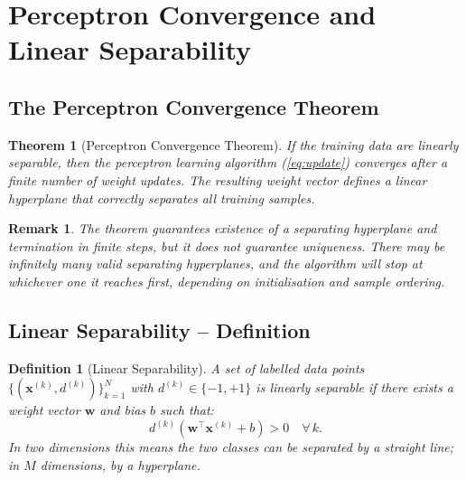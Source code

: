 \documentclass[12pt,a4paper]{article}
\newtheorem{theorem}{Theorem}[section]
\newtheorem{definition}{Definition}[section]
\newtheorem{remark}{Remark}[section]
\begin{document}
\section{Perceptron Convergence and Linear Separability}
\label{sec:convergence}

\subsection{The Perceptron Convergence Theorem}
\label{subsec:convergence-theorem}

\begin{theorem}[Perceptron Convergence Theorem]
\label{thm:convergence}
If the training data are linearly separable, then the perceptron learning
algorithm (\cref{eq:update}) converges after a finite number of weight
updates.  The resulting weight vector defines a linear hyperplane that
correctly separates all training samples.
\end{theorem}

\begin{remark}
\label{rem:uniqueness}
The theorem guarantees \emph{existence} of a separating hyperplane and
termination in \emph{finite steps}, but it does \emph{not} guarantee
uniqueness.  There may be infinitely many valid separating hyperplanes,
and the algorithm will stop at whichever one it reaches first, depending
on initialisation and sample ordering.
\end{remark}

\subsection{Linear Separability -- Definition}
\label{subsec:linear-separability-def}

\begin{definition}[Linear Separability]
\label{def:linsep}
A set of labelled data points
$\{(\mathbf{x}^{(k)}, d^{(k)})\}_{k=1}^{N}$ with $d^{(k)} \in \{-1, +1\}$
is \emph{linearly separable} if there exists a weight vector $\mathbf{w}$
and bias $b$ such that:
\begin{equation}
  \label{eq:linsep}
  d^{(k)}\!\left(\mathbf{w}^{\top}\mathbf{x}^{(k)} + b\right) > 0
  \quad \forall\, k.
\end{equation}
In two dimensions this means the two classes can be separated by a
straight line; in $M$ dimensions, by a hyperplane.
\end{definition}
\end{document}
